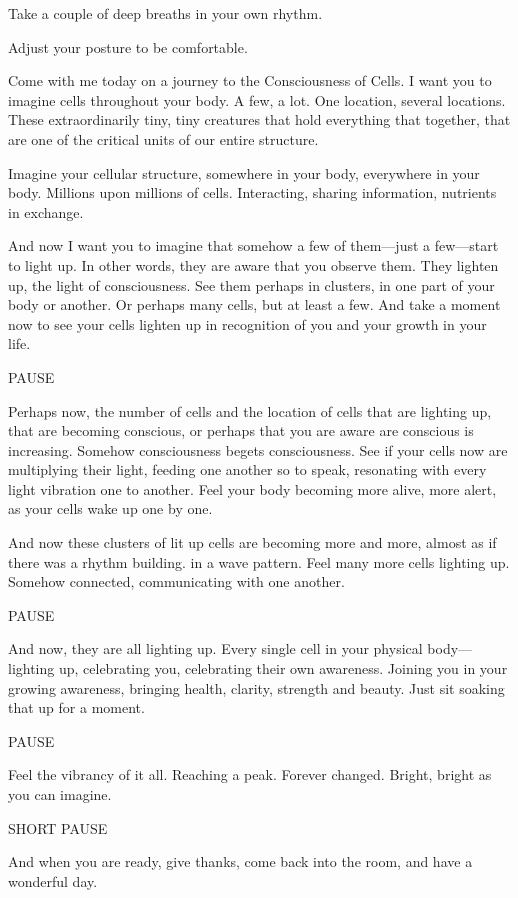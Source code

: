 \documentclass[12pt]{book}
\begin{document}
{\em

  Take a couple of deep breaths in your own rhythm.
  
  Adjust your posture to be comfortable.
  
Come with me today on a journey to the Consciousness of Cells. I want		
you to imagine cells throughout your body. A few, a lot. One location, several locations. These extraordinarily tiny, tiny creatures that hold everything that together, that are one of the critical units of our entire structure.
					
Imagine your cellular structure, somewhere in your body, everywhere in your body. Millions upon millions of cells. Interacting, sharing information, nutrients in exchange.
					
And now I want you to imagine that somehow a few of them—just a few—start to light up. In other words, they are aware that you observe them. They lighten up, the light of consciousness. See them perhaps in clusters, in one part of your body or another. Or perhaps many cells, but at least a few. And take a moment now to see your cells lighten up in recognition of you and your growth in your life.
					
PAUSE
					
Perhaps now, the number of cells and the location of cells that are lighting up, that are becoming conscious, or perhaps that you are aware are conscious is increasing. Somehow consciousness begets consciousness. See if your cells now are multiplying their light, feeding one another so to speak, resonating with every light vibration one to another. Feel your body becoming more alive, more alert, as your cells wake up one by one.


And now these clusters of lit up cells are becoming more and more, almost as if there was a rhythm building. in a wave pattern. Feel many more cells lighting up. Somehow connected, communicating with one another.
					
PAUSE
					
And now, they are all lighting up. Every single cell in your physical body— lighting up, celebrating you, celebrating their own awareness. Joining you in your growing awareness, bringing health, clarity, strength and beauty. Just sit soaking that up for a moment.
					
PAUSE
					
Feel the vibrancy of it all. Reaching a peak. Forever changed. Bright, bright as you can imagine.
					
SHORT PAUSE
					
And when you are ready, give thanks, come back into the room, and have a wonderful day.

}
\end{document}
